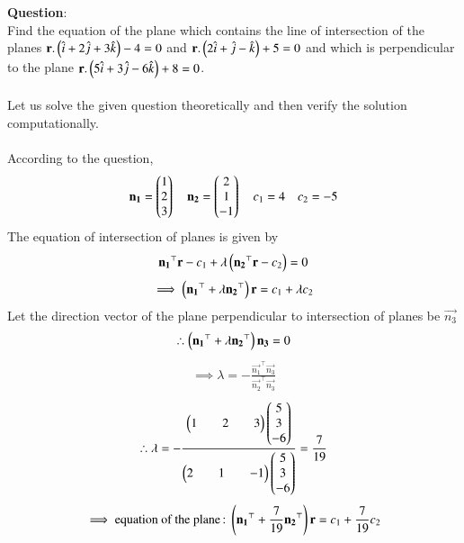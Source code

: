 \documentclass[journal]{IEEEtran}
\begin{document}
\textbf{Question}:\\
Find the equation of the plane which contains the line of intersection of the planes $\mathbf{r}.\left(\hat{i}+2\hat{j}+3\hat{k}\right)-4=0$ and $\mathbf{r}.\left(2\hat{i}+\hat{j}-\hat{k}\right)+5=0$ and which is perpendicular to the plane $\mathbf{r}.\left(5\hat{i}+3\hat{j}-6\hat{k}\right)+8=0$.\\
\solution \\
Let us solve the given question theoretically and then verify the solution computationally.\\
\\
According to the question,\\
\begin{align}
    \mathbf{n_1}=\begin{pmatrix}1\\2\\3\end{pmatrix} \quad \mathbf{n_2}=\begin{pmatrix}2\\1\\-1\end{pmatrix} \quad c_1=4 \quad c_2=-5
\end{align}
The equation of intersection of planes is given by
\begin{align}
    \mathbf{n_1}^{\top}\mathbf{r}-c_1+\lambda\left(\mathbf{n_2}^{\top}\mathbf{r}-c_2\right)=0
\end{align}
\begin{align}
    \implies \left(\mathbf{n_1}^{\top}+\lambda\mathbf{n_2}^{\top}\right)\mathbf{r}=c_1+\lambda c_2
\end{align}
Let the direction vector of the plane perpendicular to intersection of planes be $\vec{n_3}$
\begin{align}
    \therefore \left(\mathbf{n_1}^{\top}+\lambda\mathbf{n_2}^{\top}\right)\mathbf{n_3}=0
\end{align}
\begin{align}
    \implies \lambda=-\frac{\vec{n_1}^{\top}\vec{n_3}}{\vec{n_2}^{\top}\vec{n_3}}
\end{align}
\begin{align}
    \therefore \lambda=-\frac{\begin{pmatrix}1&&2&&3\end{pmatrix}\begin{pmatrix}5\\3\\-6\end{pmatrix}}{\begin{pmatrix}2&&1&&-1\end{pmatrix}\begin{pmatrix}5\\3\\-6\end{pmatrix}}=\frac{7}{19}
\end{align}
\begin{align}
    \implies \text{equation of the plane\,:\;} \left(\mathbf{n_1}^{\top}+\frac{7}{19}\mathbf{n_2}^{\top}\right)\mathbf{r}=c_1+\frac{7}{19}c_2 
\end{align}

\newpage
\vspace*{0.25cm}
\end{document}
